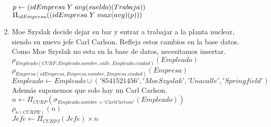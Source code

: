 \documentclass{article}
\begin{document}
\begin{enumerate}
\begin{enumerate}
				$p \leftarrow (idEmpresa \hspace{1mm} Y \hspace{1mm} avg(sueldo)(Trabaja))$\\
				$\Pi_{idEmpresa}((idEmpresa \hspace{1mm} Y \hspace{1mm} max(avg)(p)))$\\
				
				\item Moe Szyslak decide dejar su bar y entrar a trabajar a la planta nuclear, siendo su nuevo jefe
				Carl Carlson. Refleja estos cambios en la base datos.\\
				
				Como Moe Szyslak no esta en la base de datos, necesitamos insertar.\\
				
				$\rho_{Empleado(CURP, Empleado.nombre, calle, Empleado.ciudad)}(Empleado)$\\
				$\rho_{Empresa(idEmpresa, Empresa.nombre, Empresa.ciudad)}(Empresa)$\\
				$Empleado \leftarrow Empleado \cup ('8541521456', 'Moe Szyslak', 'Una calle', 'Springfield')$\\
				
				Además suponemos que solo hay un Carl Carlson.\\
				
				$n \leftarrow \Pi_{CURP}(\sigma_{Empleado.nombre = 'Carl Carlson'}(Empleado))$\\
				$\rho_{n(CURPE)}(n)$\\
				$Jefe \leftarrow \Pi_{CURPJ}(Jefe) \times n$
							
			\end{enumerate}
	\end{enumerate}	
\end{document}
